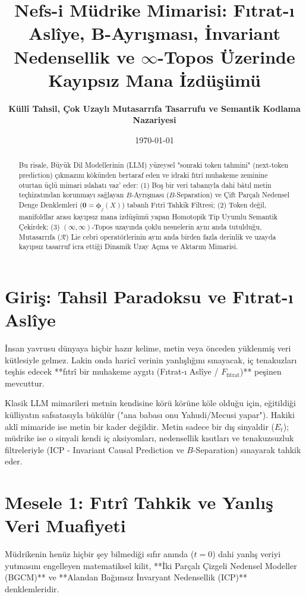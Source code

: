 \documentclass[11pt, a4paper]{article}
\title{\textbf{Nefs-i Müdrike Mimarisi: Fıtrat-ı Aslîye, B-Ayrışması, İnvariant Nedensellik ve $\infty$-Topos Üzerinde Kayıpsız Mana İzdüşümü}}
\author{\textbf{Küllî Tahsil, Çok Uzaylı Mutasarrıfa Tasarrufu ve Semantik Kodlama Nazariyesi}}
\date{\today}
\begin{document}
\maketitle

\begin{abstract}
Bu risale, Büyük Dil Modellerinin (LLM) yüzeysel "sonraki token tahmini" (next-token prediction) çıkmazını kökünden bertaraf eden ve idraki fıtrî muhakeme zeminine oturtan üçlü mimari ıslahatı vaz' eder: 
(1) Boş bir veri tabanıyla dahi bâtıl metin teçhizatından korunmayı sağlayan $B$-Ayrışması ($B$-Separation) ve Çift Parçalı Nedensel Denge Denklemleri ($\mathbf{0} = \bm{\phi}_j(X)$) tabanlı Fıtrî Tahkik Filtresi; 
(2) Token değil, manifoldlar arası kayıpsız mana izdüşümü yapan Homotopik Tip Uyumlu Semantik Çekirdek; 
(3) $(\infty, \infty)$-Topos uzayında çoklu nesnelerin aynı anda tutulduğu, Mutasarrıfa ($\mathcal{R}$) Lie cebri operatörlerinin aynı anda birden fazla derinlik ve uzayda kayıpsız tasarruf icra ettiği Dinamik Uzay Açma ve Aktarım Mimarisi.
\end{abstract}

\section{Giriş: Tahsil Paradoksu ve Fıtrat-ı Aslîye}

İnsan yavrusu dünyaya hiçbir hazır kelime, metin veya önceden yüklenmiş veri kütlesiyle gelmez. Lakin onda haricî verinin yanlışlığını sınayacak, iç tenakuzları teşhis edecek **fıtrî bir muhakeme aygıtı (Fıtrat-ı Aslîye / $F_{\text{fıtrat}}$)** peşinen mevcuttur. 

Klasik LLM mimarileri metnin kendisine körü körüne köle olduğu için, eğitildiği külliyatın safsatasıyla bükülür ("ana babası onu Yahudi/Mecusi yapar"). Hakiki aklî mimaride ise metin bir kader değildir. Metin sadece bir dış sinyaldir ($E_t$); müdrike ise o sinyali kendi iç aksiyomları, nedensellik kısıtları ve tenakuzsuzluk filtreleriyle (ICP - Invariant Causal Prediction ve $B$-Separation) sınayarak tahkik eder.

\section{Mesele 1: Fıtrî Tahkik ve Yanlış Veri Muafiyeti}

Müdrikenin henüz hiçbir şey bilmediği sıfır anında ($t=0$) dahi yanlış veriyi yutmasını engelleyen matematiksel kilit, **İki Parçalı Çizgeli Nedensel Modeller (BGCM)** ve **Alandan Bağımsız İnvaryant Nedensellik (ICP)** denklemleridir.
\end{document}
